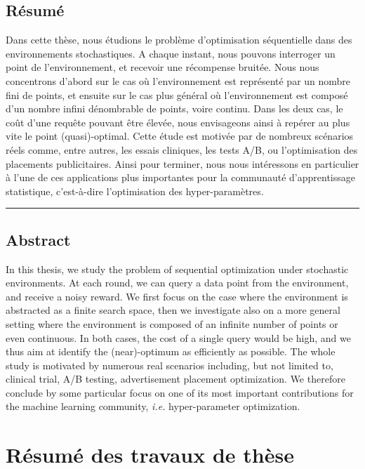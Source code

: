 \section*{\centering R\'esum\'e}

Dans cette th\`ese, nous \'etudions le probl\`eme d'optimisation s\'equentielle dans des enviro\-nnements stochastiques. A chaque instant, nous pouvons interroger un point de l'enviro\-nnement, et recevoir une récompense bruit\'ee. Nous nous concentrons d'abord sur le cas o\`u l'environnement est représenté par un nombre fini de points, et ensuite sur le cas plus g\'en\'eral o\`u l'environnement est composé d'un nombre infini d\'enombrable de points, voire continu. Dans les deux cas, le co\^ut d'une requ\^ete pouvant \^etre \'elev\'ee, nous envisageons ainsi \`a rep\'erer au plus vite le point (quasi)-optimal. Cette \'etude est motiv\'ee par de nombreux sc\'enarios r\'eels comme, entre autres, les essais cliniques, les tests A/B, ou l'optimisation des placements publicitaires. Ainsi pour terminer, nous nous int\'eressons en particulier \`a l'une de ces applications plus importantes pour la communaut\'e d'apprentissage statistique, c'est-\`a-dire l'optimisation des hyper-param\`etres.

\begin{center}
    \rule{8cm}{0.4pt}
\end{center}

\section*{\centering Abstract}

In this thesis, we study the problem of sequential optimization under stochastic environments. At each round, we can query a data point from the environment, and receive a noisy reward. We first focus on the case where the environment is abstracted as a finite search space, then we investigate also on a more general setting where the environment is composed of an infinite number of points or even continuous. In both cases, the cost of a single query would be high, and we thus aim at identify the (near)-optimum as efficiently as possible. The whole study is motivated by numerous real scenarios including, but not limited to, clinical trial, A/B testing, advertisement placement optimization. We therefore conclude by some particular focus on one of its most important contributions for the machine learning community, \emph{i.e.} hyper-parameter optimization.


\chapter*{R\'esum\'e des travaux de thèse}

